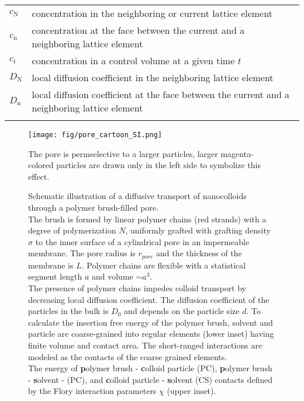 \documentclass[10pt, a4paper]{article}
\begin{document}
\begin{tabularx}{\linewidth}{l l}
$c_{\textrm{N}}$ & concentration in the neighboring or current lattice element \\
$c_{\textrm{n}}$ & concentration at the face between the current and a neighboring lattice element \\ 
$c_{t}$ & concentration in a control volume at a given time $t$ \\ 
$D_{\textrm{N}}$ & local diffusion coefficient in the neighboring lattice element \\
$D_{\textrm{n}}$ & local diffusion coefficient at the face between the current and a neighboring lattice element \\
\\
\end{tabularx}


\begin{figure*}[htp!]
    \centering
    \texttt{[image: fig/pore\_cartoon\_SI.png]}
    \caption{
        Schematic illustration of a diffusive transport of nanocolloids through a polymer brush-filled pore. 
        \\
        The brush is formed by linear polymer chains (red strands) with a degree of polymerization $N$, uniformly grafted with grafting density $\sigma$ to the inner surface of a cylindrical pore in an impermeable membrane. 
        The pore radius is $r_{pore}$ and the thickness of the membrane is $L$.
        Polymer chains are flexible with a statistical segment length $a$ and volume $\sim a^3$.
        \\
        The presence of polymer chains impedes colloid transport by decreasing local diffusion coefficient.
        The diffusion coefficient of the particles in the bulk is $D_{0}$ and depends on the particle size $d$.
        To calculate the insertion free energy of the polymer brush, solvent and particle are coarse-grained into regular elements (lower inset) having finite volume and contact area.
        The short-ranged interactions are modeled as the contacts of the coarse grained elements.
        \\
        The energy of 
        \textbf{p}olymer brush - \textbf{c}olloid particle (PC), 
        \textbf{p}olymer brush - \textbf{s}olvent -  (PC),  
        and \textbf{c}olloid particle - \textbf{s}olvent (CS) contacts defined by the Flory interaction parameters $\chi$ (upper inset).
        }
        The pore is permselective to a larger particles, larger magenta-colored particles are drawn only in the left side to symbolize this effect. 
        \label{fig:colloid_transport_SI}
\end{figure*}
\end{document}
